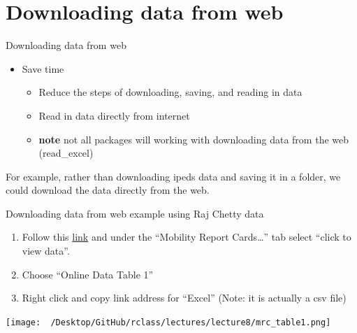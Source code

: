 \documentclass[8pt,ignorenonframetext,dvipsnames]{beamer}
\providecommand{\tightlist}{%
  \setlength{\itemsep}{0pt}\setlength{\parskip}{0pt}}
\renewcommand{\textbf}[1]{{\color{darkgray}\bfseries\fontfamily{Montserrat-TOsF}#1}}
\begin{document}
\section{Downloading data from web}\label{downloading-data-from-web}

\begin{frame}{Downloading data from web}

\begin{itemize}
\tightlist
\item
  Save time

  \begin{itemize}
  \tightlist
  \item
    Reduce the steps of downloading, saving, and reading in data\\
  \item
    Read in data directly from internet\\
  \item
    \textbf{note} not all packages will working with downloading data
    from the web (read\_excel)
  \end{itemize}
\end{itemize}

For example, rather than downloading ipeds data and saving it in a
folder, we could download the data directly from the web.

\end{frame}

\begin{frame}{Downloading data from web example using Raj Chetty data}

\begin{enumerate}
\def\labelenumi{\arabic{enumi}.}
\tightlist
\item
  Follow this \href{http://www.equality-of-opportunity.org/data/}{link}
  and under the ``Mobility Report Cards\ldots{}'' tab select ``click to
  view data''.\\
\item
  Choose ``Online Data Table 1''
\item
  Right click and copy link address for ``Excel'' (Note: it is actually
  a csv file)
\end{enumerate}

\texttt{[image: ~/Desktop/GitHub/rclass/lectures/lecture8/mrc\_table1.png]}~

\end{frame}
\end{document}
